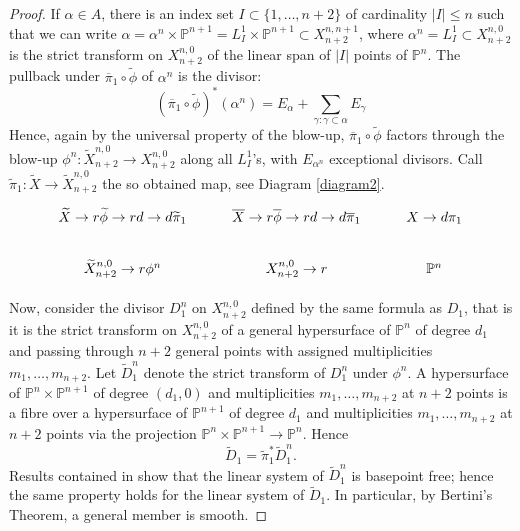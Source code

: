 \documentclass[a4paper,11pt]{article}
\newcommand{\PP}{\mathbb P}
\newcommand{\arrow}{\rightarrow}
\begin{document}
\begin{proof}
If $\alpha \in A$, there is an index set $I\subset\{1,\dots,n+2\}$ of cardinality $|I|\le n$ such that  we can write $\alpha=\alpha^n\times\PP^{n+1}=L^1_I \times \PP^{n+1} \subset X^{n,n+1}_{n+2}$, where $\alpha^n=L^1_I\subset X^{n,0}_{n+2}$ is the strict transform on $X^{n,0}_{n+2}$ of the linear span of $|I|$ points of $\PP^n$.
The pullback under $\overline{\pi}_1\circ\widetilde{\phi}$ of $\alpha^n$ is the divisor:
\begin{equation}\label{lifting-exceptionals}
(\overline{\pi}_1\circ\widetilde{\phi})^\ast(\alpha^n)=E_\alpha +\sum_{\gamma: \gamma \subset \alpha}E_\gamma 
\end{equation}
Hence, again by the universal property of the blow-up, $\overline{\pi}_1\circ\widetilde{\phi}$ factors through the blow-up $\phi^n:\widetilde{X}^{n,0}_{n+2}\to X^{n,0}_{n+2}$ along all $L^1_I$'s, with $E_{\alpha^n}$ exceptional divisors.  Call $\widetilde{\pi}_1:\widetilde{X}\to \widetilde{X}^{n,0}_{n+2}$  the so obtained map, see Diagram \eqref{diagram2}.
%
\begin{equation}\label{diagram2}\begin{tikzcd}
\widetilde{X}\arrow{r}{\widetilde{\phi}} \arrow{rd} \arrow{d}{\widetilde{\pi}_1} 
& \overline{X} \arrow{r}{\overline{\phi}} \arrow{rd} \arrow{d}{\overline{\pi}_1} & X \arrow{d}{\pi_1} \\
\widetilde{X}^{n,0}_{n+2} \arrow{r}{\phi^n}&   X^{n,0}_{n+2} \arrow{r}{} & \PP^n
\end{tikzcd}
\end{equation}

Now, consider the divisor $D_1^n$ on $X^{n,0}_{n+2}$ defined by the same formula as $D_1$, that is it is the strict transform on $X^{n,0}_{n+2}$ of a general hypersurface of $\PP^n$ of degree $d_1$ and passing through $n+2$ general points with assigned multiplicities $m_1,\dots,m_{n+2}$.
Let $\widetilde{D}^n_1$ denote the strict transform of $D^n_1$ under $\phi^n$.
A hypersurface of $\PP^n\times\PP^{n+1}$ of degree $(d_1,0)$ and multiplicities $m_1,\dots,m_{n+2}$ at $n+2$ points is a fibre over a hypersurface of $\PP^{n+1}$ of degree $d_1$ and multiplicities $m_1,\dots,m_{n+2}$ at $n+2$ points via the projection $\PP^n\times\PP^{n+1}\to\PP^n$. Hence
\begin{equation}\label{lifting-strict-transforms}\widetilde{D}_1=\widetilde{\pi}_1^\ast\widetilde{D}^n_1.\end{equation}
Results contained in  \cite[Theorem 2.1 and Remark 2.5]{DP19} show that the linear system of $\widetilde{D}^n_1$ is basepoint free; hence the same property holds for the linear system of $\widetilde{D}_1$. In particular,  by Bertini's Theorem, a general member is smooth. 
\end{proof}
\end{document}
